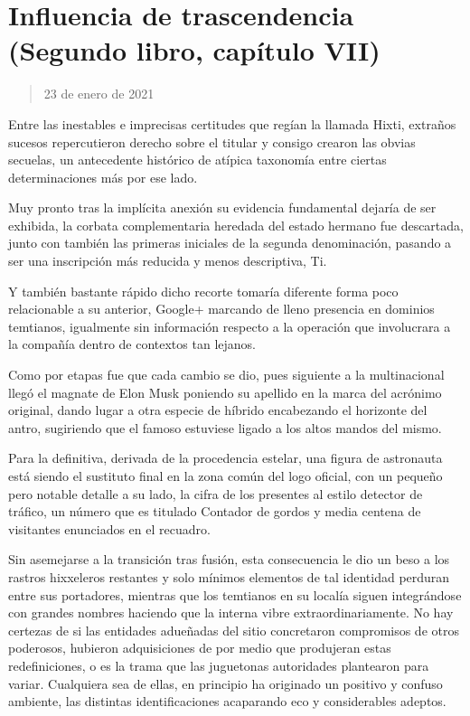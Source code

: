 \documentclass[
]{book}
\begin{document}
\hypertarget{influencia-de-trascendencia-segundo-libro-capuxedtulo-vii}{%
\section{Influencia de trascendencia (Segundo libro, capítulo VII)}\label{influencia-de-trascendencia-segundo-libro-capuxedtulo-vii}}

\begin{quote}
23 de enero de 2021
\end{quote}

Entre las inestables e imprecisas certitudes que regían la llamada Hixti, extraños sucesos repercutieron derecho sobre el titular y consigo crearon las obvias secuelas, un antecedente histórico de atípica taxonomía entre ciertas determinaciones más por ese lado.

Muy pronto tras la implícita anexión su evidencia fundamental dejaría de ser exhibida, la corbata complementaria heredada del estado hermano fue descartada, junto con también las primeras iniciales de la segunda denominación, pasando a ser una inscripción más reducida y menos descriptiva, Ti.

Y también bastante rápido dicho recorte tomaría diferente forma poco relacionable a su anterior, Google+ marcando de lleno presencia en dominios temtianos, igualmente sin información respecto a la operación que involucrara a la compañía dentro de contextos tan lejanos.

Como por etapas fue que cada cambio se dio, pues siguiente a la multinacional llegó el magnate de Elon Musk poniendo su apellido en la marca del acrónimo original, dando lugar a otra especie de híbrido encabezando el horizonte del antro, sugiriendo que el famoso estuviese ligado a los altos mandos del mismo.

Para la definitiva, derivada de la procedencia estelar, una figura de astronauta está siendo el sustituto final en la zona común del logo oficial, con un pequeño pero notable detalle a su lado, la cifra de los presentes al estilo detector de tráfico, un número que es titulado Contador de gordos y media centena de visitantes enunciados en el recuadro.

Sin asemejarse a la transición tras fusión, esta consecuencia le dio un beso a los rastros hixxeleros restantes y solo mínimos elementos de tal identidad perduran entre sus portadores, mientras que los temtianos en su localía siguen integrándose con grandes nombres haciendo que la interna vibre extraordinariamente. No hay certezas de si las entidades adueñadas del sitio concretaron compromisos de otros poderosos, hubieron adquisiciones de por medio que produjeran estas redefiniciones, o es la trama que las juguetonas autoridades plantearon para variar. Cualquiera sea de ellas, en principio ha originado un positivo y confuso ambiente, las distintas identificaciones acaparando eco y considerables adeptos.
\end{document}
